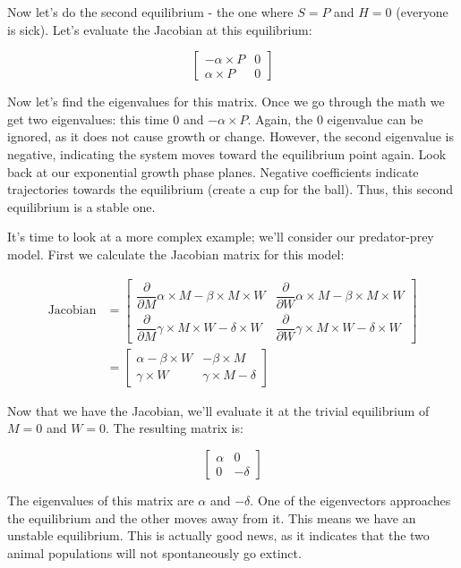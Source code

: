 \documentclass[]{memoir}
\begin{document}
Now let's do the second equilibrium - the one where $S=P$ and $H=0$
(everyone is sick). Let's evaluate the Jacobian at this equilibrium:

\[
\begin{bmatrix}
-\alpha \times P & 0 \\
\alpha \times P & 0
\end{bmatrix}
\]

Now let's find the eigenvalues for this matrix. Once we go through the
math we get two eigenvalues: this time 0 and $-\alpha \times P$. Again,
the 0 eigenvalue can be ignored, as it does not cause growth or change.
However, the second eigenvalue is negative, indicating the system moves
toward the equilibrium point again. Look back at our exponential growth
phase planes. Negative coefficients indicate trajectories towards the
equilibrium (create a cup for the ball). Thus, this second equilibrium
is a stable one.

It's time to look at a more complex example; we'll consider our
predator-prey model. First we calculate the Jacobian matrix for this
model:

\[
\begin{split}
\text{Jacobian} &= \begin{bmatrix} \dfrac{\partial}{\partial M }  \alpha \times M - \beta \times M \times W & \dfrac{\partial}{\partial W }  \alpha \times M - \beta \times M \times W  \\  \dfrac{\partial}{\partial M } \gamma \times M \times W - \delta \times W & \dfrac{\partial}{\partial W } \gamma \times M \times W - \delta \times W \end{bmatrix} \\
& = \begin{bmatrix}
\alpha - \beta \times W & -\beta \times M \\
\gamma \times W & \gamma \times M - \delta
\end{bmatrix}
\end{split}
\]

Now that we have the Jacobian, we'll evaluate it at the trivial
equilibrium of $M=0$ and $W=0$. The resulting matrix is:

\[
\begin{bmatrix}
\alpha  & 0 \\
0 & -\delta
\end{bmatrix}
\]

The eigenvalues of this matrix are $\alpha$ and $-\delta$. One of the
eigenvectors approaches the equilibrium and the other moves away from
it. This means we have an unstable equilibrium. This is actually good
news, as it indicates that the two animal populations will not
spontaneously go extinct.
\end{document}
